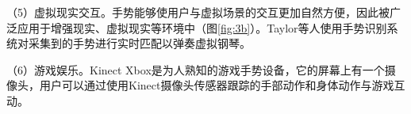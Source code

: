 
（5）虚拟现实交互。手势能够使用户与虚拟场景的交互更加自然方便，因此被广泛应用于增强现实、虚拟现实等环境中（图\ref{fig:3b}）。Taylor等人使用手势识别系统对采集到的手势进行实时匹配以弹奏虚拟钢琴\cite{taylor2016efficient}。

（6）游戏娱乐。Kinect Xbox是为人熟知的游戏手势设备，它的屏幕上有一个摄像头，用户可以通过使用Kinect摄像头传感器跟踪的手部动作和身体动作与游戏互动。

